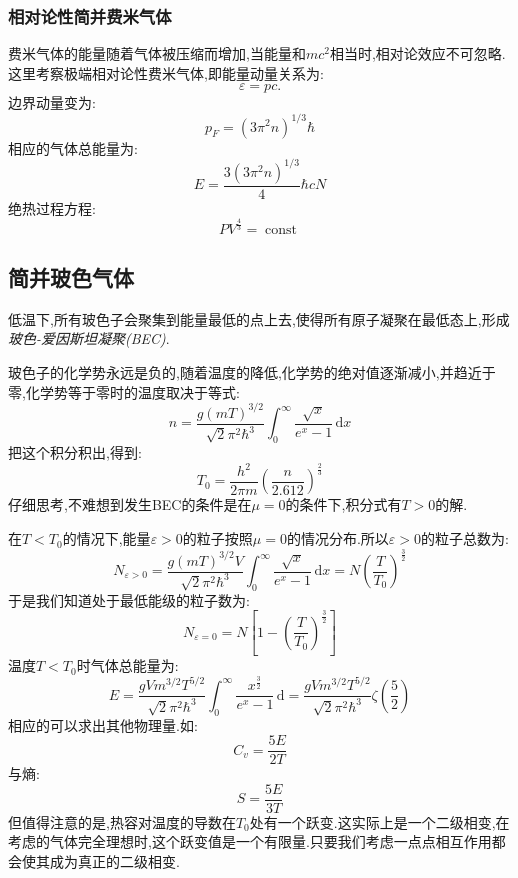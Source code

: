 \subsubsection{相对论性简并费米气体}
    费米气体的能量随着气体被压缩而增加,当能量和$mc^{2}$相当时,相对论效应不可忽略.这里考察极端相对论性费米气体,即能量动量关系为:
    \[\varepsilon=pc.\]
    边界动量变为:
    \begin{equation}
      p_F=(3\pi^{2}n)^{1 /3}\hbar
    \end{equation}
    相应的气体总能量为:
    \begin{equation}
      E=\frac{3(3\pi^{2}n)^{1 /3}}{4}\hbar c N
    \end{equation}
    绝热过程方程:
    \begin{equation}
      PV^{\frac{4}{3}}=\operatorname{const}
    \end{equation}
\subsection{简并玻色气体}
    低温下,所有玻色子会聚集到能量最低的点上去,使得所有原子凝聚在最低态上,形成\emph{玻色-爱因斯坦凝聚(BEC)}.

    玻色子的化学势永远是负的,随着温度的降低,化学势的绝对值逐渐减小,并趋近于零,化学势等于零时的温度取决于等式:
    \begin{equation}
      n=\frac{g(mT)^{3 /2}}{\sqrt{2}\pi^{2}\hbar^{3}}\int_{0}^{\infty} \frac{\sqrt{x}}{e^{x}-1} \, \mathrm{d}x
    \end{equation}
    把这个积分积出,得到:
    \begin{equation}
      T_0=\frac{h^{2}}{2\pi m}\left( \frac{n}{2.612} \right)^{\frac{2}{3}} 
    \end{equation}
    仔细思考,不难想到发生BEC的条件是在$\mu=0$的条件下,积分式有$T>0$的解.

    在$T<T_0$的情况下,能量$\varepsilon>0$的粒子按照$\mu=0$的情况分布.所以$\varepsilon>0$的粒子总数为:
    \begin{equation}
      N_{\varepsilon>0}=\frac{g(mT)^{3 /2}V}{\sqrt{2}\pi^{2}\hbar^{3}}\int_{0}^{\infty} \frac{\sqrt{x}}{e^{x}-1} \, \mathrm{d}x=N\left( \frac{T}{T_0} \right) ^{\frac{3}{2}}
    \end{equation}
    于是我们知道处于最低能级的粒子数为:
    \begin{equation}
      N_{\varepsilon=0}=N\left[ 1-\left( \frac{T}{T_0} \right) ^{\frac{3}{2}} \right]  
    \end{equation}
    温度$T<T_0$时气体总能量为:
    \[E=\frac{gVm^{3 /2}T^{5 /2}}{\sqrt{2}\pi^{2}\hbar^{3}}\int_{0}^{\infty} \frac{x^{\frac{3}{2}}}{e^{x}-1} \, \mathrm{d}=\frac{gVm^{3 /2}T^{5 /2}}{\sqrt{2}\pi^{2}\hbar^{3}}\zeta(\frac{5}{2})\]
    相应的可以求出其他物理量.如:
    \[C_v=\frac{5E}{2T}\]
    与熵:
    \[S=\frac{5E}{3T}\]
    但值得注意的是,热容对温度的导数在$T_0$处有一个跃变.这实际上是一个二级相变,在考虑的气体完全理想时,这个跃变值是一个有限量.只要我们考虑一点点相互作用都会使其成为真正的二级相变.


